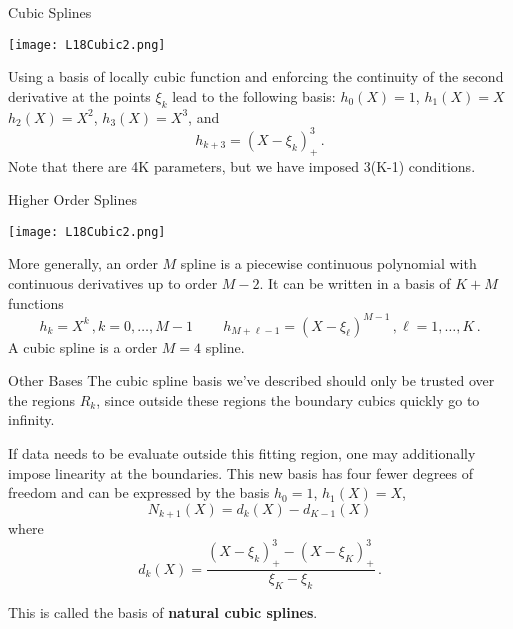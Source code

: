 \documentclass[10pt, table, dvipsnames,xcdraw,handout]{beamer}
\begin{document}
\begin{frame}[fragile]{Cubic Splines}
  \begin{minipage}[t][0.5\textheight][t]{\textwidth}
	\centering \texttt{[image: L18Cubic2.png]} 
  \end{minipage}
  \vfill
\begin{minipage}[t][0.5\textheight][t]{\textwidth}
Using a basis of locally cubic function and enforcing the continuity of the second derivative at the points $\xi_k$ lead to the following basis: $h_0(X) = 1$, $h_1(X)= X$ $h_2(X) = X^2$, $h_3(X) = X^3$, and 
$$
h_{k+3} = (X - \xi_k)_+^3\,.
$$\pause
Note that there are 4K parameters, but we have imposed 3(K-1) conditions.
\end{minipage}
\end{frame}


\begin{frame}[fragile]{Higher Order Splines}
  \begin{minipage}[t][0.5\textheight][t]{\textwidth}
	\centering \texttt{[image: L18Cubic2.png]} 
  \end{minipage}
  \vfill
\begin{minipage}[t][0.5\textheight][t]{\textwidth}
More generally, an order $M$ spline is a piecewise continuous polynomial with continuous derivatives up to order $M-2$. \pause It can be written in a basis of $K + M$ functions 
$$
h_{k} = X^k\,,k=0,\ldots, M-1\,\hspace{2em} h_{M+\ell -1} = (X-\xi_\ell)^{M-1}\,, \ell=1,\ldots, K\,.
$$\pause
A cubic spline is a order $M=4$ spline. 
\end{minipage}
\end{frame}



\begin{frame}[fragile]{Other Bases}
The cubic spline basis we've described should only be trusted over the regions $R_k$, since outside these regions the boundary cubics quickly go to infinity. \pause 

If data needs to be evaluate outside this fitting region, one may additionally impose linearity at the boundaries. This new basis has four fewer degrees of freedom and can be expressed by the basis $h_0 = 1$, $h_1(X) = X$, 
$$
N_{k+1}(X) = d_k(X) - d_{K-1}(X) 
$$\pause
where
$$
d_k(X) = \frac{(X-\xi_k)_+^3 - (X-\xi_K)_+^3}{\xi_K - \xi_k}\,.
$$\pause

This is called the basis of \textbf{natural cubic splines}.
\end{frame}
\end{document}
